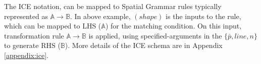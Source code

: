 The ICE notation, can be mapped to Spatial Grammar rules typically represented as $\mathbb{A} \rightarrow \mathbb{B}$. In above example, $(shape)$ is the inputs to the rule, which can be mapped to LHS ($\mathbb{A}$) for the matching condition. On this input, transformation rule $\mathbb{A} \rightarrow \mathbb{B}$ is applied, using specified-arguments in the $\{\bar{p},line,n\}$ to generate RHS ($\mathbb{B}$). More details of the ICE schema are in Appendix \ref{appendix:ice}.
